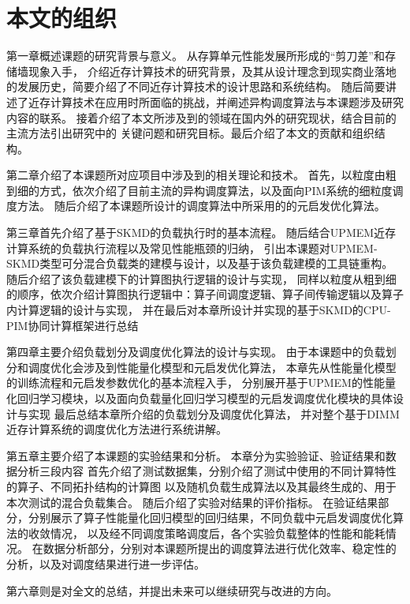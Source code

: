 \section{本文的组织}\label{sec:doc_organization}
第一章概述课题的研究背景与意义。
从存算单元性能发展所形成的“剪刀差”和存储墙现象入手，
介绍近存计算技术的研究背景，及其从设计理念到现实商业落地的发展历史，简要介绍了不同近存计算技术的设计思路和系统结构。
随后简要讲述了近存计算技术在应用时所面临的挑战，并阐述异构调度算法与本课题涉及研究内容的联系。
接着介绍了本文所涉及到的领域在国内外的研究现状，结合目前的主流方法引出研究中的
关键问题和研究目标。最后介绍了本文的贡献和组织结构。

第二章介绍了本课题所对应项目中涉及到的相关理论和技术。
首先，以粒度由粗到细的方式，依次介绍了目前主流的异构调度算法，以及面向PIM系统的细粒度调度方法。
随后介绍了本课题所设计的调度算法中所采用的的元启发优化算法。

第三章首先介绍了基于SKMD的负载执行时的基本流程。
随后结合UPMEM近存计算系统的负载执行流程以及常见性能瓶颈的归纳，
引出本课题对UPMEM-SKMD类型可分混合负载类的建模与设计，以及基于该负载建模的工具链重构。
随后介绍了该负载建模下的计算图执行逻辑的设计与实现，
同样以粒度从粗到细的顺序，依次介绍计算图执行逻辑中：算子间调度逻辑、算子间传输逻辑以及算子内计算逻辑的设计与实现，
并在最后对本章所设计并实现的基于SKMD的CPU-PIM协同计算框架进行总结

第四章主要介绍负载划分及调度优化算法的设计与实现。
由于本课题中的负载划分和调度优化会涉及到性能量化模型和元启发优化算法，
本章先从性能量化模型的训练流程和元启发参数优化的基本流程入手，
分别展开基于UPMEM的性能量化回归学习模块，以及面向负载量化回归学习模型的元启发调度优化模块的具体设计与实现
最后总结本章所介绍的负载划分及调度优化算法，
并对整个基于DIMM近存计算系统的调度优化方法进行系统讲解。

第五章主要介绍了本课题的实验结果和分析。
本章分为实验验证、验证结果和数据分析三段内容
首先介绍了测试数据集，分别介绍了测试中使用的不同计算特性的算子、不同拓扑结构的计算图
以及随机负载生成算法以及其最终生成的、用于本次测试的混合负载集合。
随后介绍了实验对结果的评价指标。
在验证结果部分，分别展示了算子性能量化回归模型的回归结果，不同负载中元启发调度优化算法的收敛情况，
以及经不同调度策略调度后，各个实验负载整体的性能和能耗情况。
在数据分析部分，分别对本课题所提出的调度算法进行优化效率、稳定性的分析，以及对调度结果进行进一步评估。

第六章则是对全文的总结，并提出未来可以继续研究与改进的方向。
